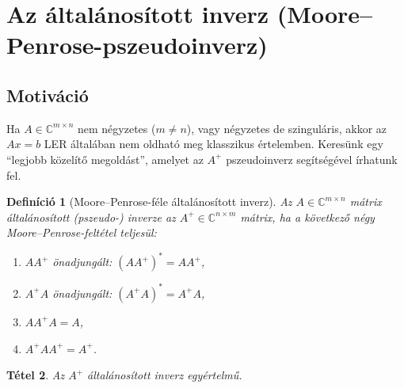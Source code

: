 \documentclass[a4paper,12pt]{article}
\theoremstyle{mydef}
\newtheorem{tetel}{Tétel}[section]
\newtheorem{definicio}[tetel]{Definíció}
\newcommand{\C}{\mathbb{C}}
\begin{document}
\section{Az általánosított inverz (Moore--Penrose-pszeudoinverz)}
\label{sec:pseudoinv}

\subsection*{Motiváció}

Ha $A \in \C^{m\times n}$ nem négyzetes ($m \ne n$), vagy négyzetes de szinguláris, akkor
az $Ax = b$ LER általában nem oldható meg klasszikus értelemben. Keresünk egy
``legjobb közelítő megoldást'', amelyet az $A^+$ pszeudoinverz segítségével írhatunk fel.

\begin{mdframed}[backgroundcolor=defbg,linewidth=0pt,innertopmargin=8pt,innerbottommargin=8pt]
\begin{definicio}[Moore--Penrose-féle általánosított inverz]
Az $A \in \C^{m\times n}$ mátrix \emph{általánosított (pszeudo-) inverze} az $A^+ \in \C^{n\times m}$
mátrix, ha a következő négy \emph{Moore--Penrose-feltétel} teljesül:
\begin{enumerate}[noitemsep,topsep=2pt]
  \item $AA^+$ önadjungált: $(AA^+)^* = AA^+$,
  \item $A^+A$ önadjungált: $(A^+A)^* = A^+A$,
  \item $AA^+A = A$,
  \item $A^+AA^+ = A^+$.
\end{enumerate}
\end{definicio}
\end{mdframed}

\begin{mdframed}[backgroundcolor=thmbg,linewidth=0pt,innertopmargin=8pt,innerbottommargin=8pt]
\begin{tetel}
Az $A^+$ általánosított inverz \emph{egyértelmű}.
\end{tetel}
\end{mdframed}
\end{document}
